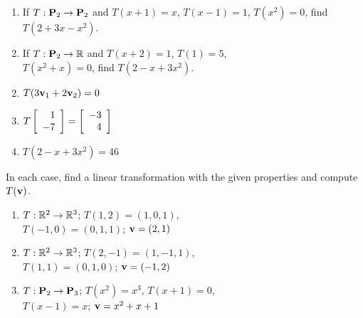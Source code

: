 \begin{multicols}{2}
\begin{ex}
\begin{enumerate}[label={\alph*.}]
\item If $T : \textbf{P}_{2} \to \textbf{P}_{2}$ and $T(x + 1) = x$, $T(x - 1) = 1$, $T(x^{2}) = 0$, find $T(2 + 3x - x^{2})$.

\item If $T : \textbf{P}_{2} \to \mathbb{R}$ and $T(x + 2) = 1$, $T(1) = 5$, \\ $T(x^{2} + x) = 0$, find $T(2 - x + 3x^{2})$.

\end{enumerate}
\begin{sol}
\begin{enumerate}[label={\alph*.}]
\setcounter{enumi}{1}
\item $T(3\textbf{v}_{1} + 2\textbf{v}_{2}) = 0$

\setcounter{enumi}{3}
\item $T\left[ \begin{array}{r}
1 \\
-7
\end{array} \right] = \left[ \begin{array}{r}
-3 \\
4
\end{array} \right]$

\setcounter{enumi}{5}
\item $T(2 - x + 3x^{2}) = 46$

\end{enumerate}
\end{sol}
\end{ex}

\begin{ex}
In each case, find a linear transformation with the given properties and compute $T(\textbf{v})$.


\begin{enumerate}[label={\alph*.}]
\item $T : \mathbb{R}^2 \to \mathbb{R}^3$; $T(1, 2) = (1, 0, 1)$, \\ $T(-1, 0) = (0, 1, 1)$; $\textbf{v} = (2, 1)$

\item $T : \mathbb{R}^2 \to \mathbb{R}^3$; $T(2, -1) = (1, -1, 1)$, \\ $T(1, 1) = (0, 1, 0)$; $\textbf{v} = (-1, 2)$

\item $T : \textbf{P}_{2} \to \textbf{P}_{3}$; $T(x^{2}) = x^{3}$, $T(x + 1) = 0$, \\ $T(x - 1) = x$; $\textbf{v} = x^{2} + x + 1$


\end{enumerate}
\end{ex}
\end{multicols}
